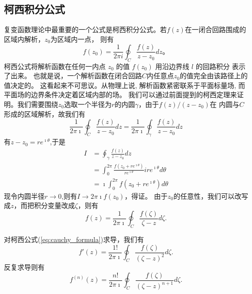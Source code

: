\subsection{柯西积分公式}
\label{subsec:cauchy_formula}
复变函数理论中最重要的一个公式是柯西积分公式。若$f(z)$在一闭合回路围成的区域内解析，$z_0$为区域内一点，
则有
\begin{equation}
    f\left(z_0\right)=\frac{1}{2 \pi i} \oint_C \frac{f(z)}{z-z_0} d z \textrm{。}  
\end{equation}
柯西公式将解析函数在任何一内点 $z_0$ 的值 $f(z_0)$ 用沿边界线 $l$ 的回路积分 表示了出来。
也就是说，一个解析函数在闭合回路$C$内任意点$z_0$的值完全由该路径上的值决定的。 
这看起来不可思议。从物理上说, 解析函数紧密联系于平面标量场, 而平面场的边界条件决定着区域内部的场。
我们可以通过前面提到的柯西定理来证明。我们需要围绕$z_0$选取一个半径为$r$的内圆$\gamma$，由于$f(z)/(z-z_0)$在
内圆与$C$形成的区域解析，故我们有
\[ \frac{1}{2 \pi \imath} \oint_C \frac{f(z)}{z-z_0} d z = \frac{1}{2 \pi \imath} \oint_\gamma \frac{f(z)}{z-z_0} d z
    \]
有$z-z_0 = re^{\imath \theta}$,于是
\begin{equation}
    \begin{aligned}
        I &= \oint_\gamma \frac{f(z)}{z-z_0} d z
        \\
        & = \int _0 ^{2\pi} \frac{f(z_0 + re^{\imath \theta})}{re^{\imath \theta}} ire^{\imath \theta} d\theta
        \\
        & = \imath \int _0 ^{2\pi} f(z_0 + re^{\imath \theta}) d\theta
    \end{aligned}
\end{equation}
现令内圆半径$r\to 0$,则有$I\to 2\pi\imath f(z_0)$，得证。
由于$z_0$的任意性，我们可以改写成$z$，而把积分变量改成$\zeta$，则有
\begin{equation}
    f(z) = \frac{1}{2\pi \imath} \oint_C \frac{f(\zeta)}{\zeta - z} d \zeta.
    \label{eq:cauchy_formula}
\end{equation}

对柯西公式(\ref{eq:cauchy_formula})求导，我们有
\begin{equation}
    f'(z) = \frac{1!}{2\pi \imath} \oint_C \frac{f(\zeta)}{(\zeta - z)^2} d \zeta.
    \label{eq:cauchy_formula_1st_derivative}
\end{equation}
反复求导则有
\begin{equation}
    f^{(n)}(z) = \frac{n!}{2\pi \imath} \oint_C \frac{f(\zeta)}{(\zeta - z)^{n+1}} d \zeta.
    \label{eq:cauchy_formula_nth_derivative}
\end{equation}

